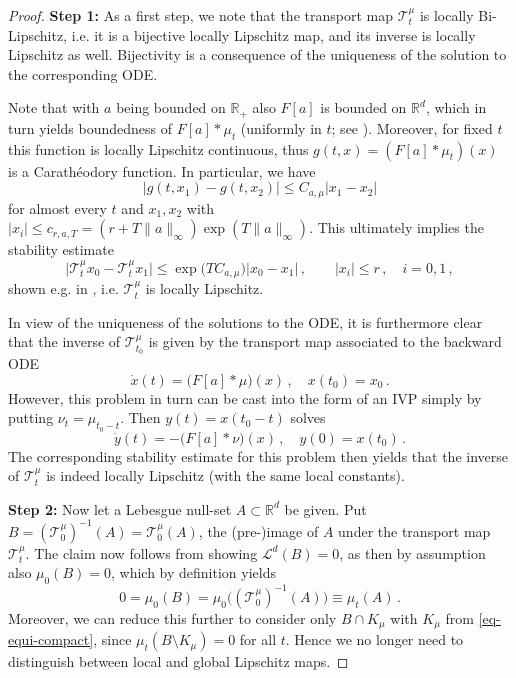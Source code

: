 \documentclass[A4paper,11pt]{article}
\theoremstyle{definition}
\newcommand{\R}{\mathbb{R}}
\newcommand{\cl}{\mathcal{L}}
\newcommand{\ct}{\mathcal{T}}
\begin{document}
\begin{proof}
	{\bf Step 1:} As a first step, we note that the transport map $\ct^\mu_t$ is locally Bi-Lipschitz, i.e. it is a bijective
	locally Lipschitz map, and its inverse is locally Lipschitz as well. Bijectivity is a consequence of the uniqueness of
	the solution to the corresponding ODE.
	
	Note that with $a$ being bounded on $\R_+$ also $F[a]$ is bounded on $\R^d$, which in turn yields boundedness
	of $F[a]\ast\mu_t$ (uniformly in $t$; see \cite[Lemma 6.4]{FornasierSolombrino}). Moreover, for fixed $t$ this
	function is locally Lipschitz continuous, thus $g(t,x)=(F[a]\ast\mu_t)(x)$ is a Carath\'eodory function. In particular,
	we have
	\[
		|g(t,x_1)-g(t,x_2)|\leq C_{a,\mu}|x_1-x_2|
	\]
	for almost every $t$ and $x_1,x_2$ with $|x_i|\leq c_{r,a,T}=(r+T\|a\|_\infty)\exp(T\|a\|_\infty)$. This ultimately
	implies the stability estimate
	\[
		\bigl|\ct^\mu_t x_0-\ct^\mu_t x_1\bigr|
			\leq\exp\bigl(TC_{a,\mu}\bigr)|x_0-x_1|\,,\qquad |x_i|\leq r\,,\quad i=0,1\,,
	\]
	shown e.g. in \cite[Lemma 6.3]{FornasierSolombrino}, i.e. $\ct^\mu_t$ is locally Lipschitz.
	
	In view of the uniqueness of the solutions to the ODE, it is furthermore clear that the inverse of $\ct^\mu_{t_0}$ is
	given by the transport map associated to the backward ODE
	\[
		\dot x(t)=\bigl(F[a]\ast\mu\bigr)(x)\,,\quad x(t_0)=x_0\,.
	\]
	However, this problem in turn can be cast into the form of an IVP simply by putting $\nu_t=\mu_{t_0-t}$. Then
	$y(t)=x(t_0-t)$ solves
	\[
		\dot y(t)=-\bigl(F[a]\ast\nu\bigr)(x)\,,\quad y(0)=x(t_0)\,.
	\]
	The corresponding stability estimate for this problem then yields that the inverse of $\ct^\mu_t$ is indeed
	locally Lipschitz (with the same local constants).
	
	{\bf Step 2:} Now let a Lebesgue null-set $A\subset\R^d$ be given. Put $B=(\ct^\mu_0)^{-1}(A)=\ct^\mu_0(A)$,
	the (pre-)image of $A$ under the transport map $\ct^\mu_t$. The claim now follows from showing $\cl^d(B)=0$,
	as then by assumption also $\mu_0(B)=0$, which by definition yields
	\[
		0=\mu_0(B)=\mu_0\bigl((\ct^\mu_0)^{-1}(A)\bigr)\equiv\mu_t(A)\,.
	\]
	Moreover, we can reduce this further to consider only $B\cap K_\mu$ with $K_\mu$ from
	\eqref{eq-equi-compact}, since $\mu_t(B\setminus K_\mu)=0$ for all $t$. Hence we no longer need to distinguish
	between local and global Lipschitz maps.
	

\end{proof}
\end{document}
